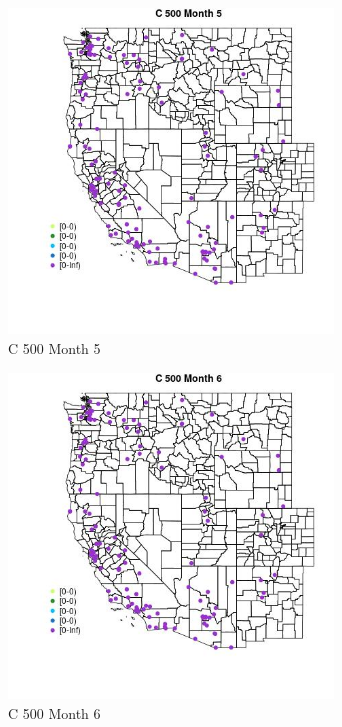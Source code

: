 \begin{figure} 
\centering  
\includegraphics[width=0.77\textwidth]{Code_Outputs/Report_ML_input_PM25_Step4_part_e_de_duplicated_aves_MapObsMo5C_500.jpg} 
\caption{\label{fig:Report_ML_input_PM25_Step4_part_e_de_duplicated_avesMapObsMo5C_500}C 500 Month 5} 
\end{figure} 
 

\begin{figure} 
\centering  
\includegraphics[width=0.77\textwidth]{Code_Outputs/Report_ML_input_PM25_Step4_part_e_de_duplicated_aves_MapObsMo6C_500.jpg} 
\caption{\label{fig:Report_ML_input_PM25_Step4_part_e_de_duplicated_avesMapObsMo6C_500}C 500 Month 6} 
\end{figure} 
 

